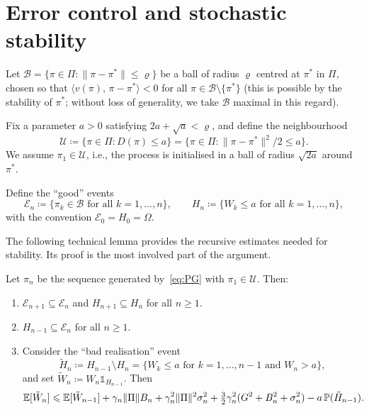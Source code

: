 \documentclass[a4paper,oneside,11pt]{report}
\newcommand{\ind}{\mathds{1}}
\newcommand{\Prob}{\mathbb{P}}
\newcommand{\calB}{\mathcal{B}}
\newcommand{\calE}{\mathcal{E}}
\newcommand{\calU}{\mathcal{U}}
\newcommand{\ip}[2]{\langle #1,\, #2 \rangle}
\newcommand{\norm}[1]{\| #1 \|}
\numberwithin{theorem}{chapter}
\numberwithin{equation}{chapter}
\begin{document}
\section{Error control and stochastic stability}
\label{sec:stability}

Let $\calB = \{\pi \in \Pi : \norm{\pi - \pi^*} \le \varrho\}$ be a
ball of radius $\varrho$ centred at $\pi^*$ in $\Pi$, chosen so that
$\ip{v(\pi)}{\pi - \pi^*} < 0$ for all
$\pi \in \calB \setminus \{\pi^*\}$ (this is possible by the stability
of $\pi^*$; without loss of generality, we take $\calB$ maximal in this
regard).

Fix a parameter $a > 0$ satisfying $2a + \sqrt{a} < \varrho$, and
define the neighbourhood
\begin{equation}
  \label{eq:U-def}
  \calU \coloneqq \{\pi \in \Pi : D(\pi) \le a\}
  = \bigl\{\pi \in \Pi : \norm{\pi - \pi^*}^2/2 \le a\bigr\}.
\end{equation}
We assume $\pi_1 \in \calU$, i.e., the process is initialised in a ball
of radius $\sqrt{2a}$ around~$\pi^*$.

Define the ``good'' events
\begin{equation}
  \label{eq:good-events}
  \calE_n \coloneqq \{\pi_k \in \calB
  \text{ for all } k = 1, \ldots, n\},
  \qquad
  H_n \coloneqq \{W_k \le a
  \text{ for all } k = 1, \ldots, n\},
\end{equation}
with the convention $\calE_0 = H_0 = \Omega$.

The following technical lemma provides the recursive estimates needed for
stability. Its proof is the most involved part of the argument.

\begin{lemma}
  \label{lem:error-control}
  Let $\pi_n$ be the sequence generated by~\eqref{eq:PG} with
  $\pi_1 \in \calU$. Then:
  \begin{enumerate}[label=\textup{(\alph*)}]
  \item $\calE_{n+1} \subseteq \calE_n$ and
    $H_{n+1} \subseteq H_n$ for all $n \ge 1$.
  \item $H_{n-1} \subseteq \calE_n$ for all $n \ge 1$.
  \item Consider the ``bad realisation'' event
    \begin{equation}
      \label{eq:bad-event}
      \tilde H_n \coloneqq H_{n-1} \setminus H_n
      = \{W_k \le a \text{ for } k = 1, \ldots, n-1
      \text{ and } W_n > a\},
    \end{equation}
    and set
    $\tilde W_n \coloneqq W_n \ind_{H_{n-1}}$. Then
    \begin{equation}
      \label{eq:Wtilde-recursion}
      \E[\tilde W_n] \le \E[\tilde W_{n-1}]
      + \gamma_n \norm{\Pi} B_n
      + \gamma_n^2 \norm{\Pi}^2 \sigma_n^2
      + \tfrac{3}{2}\gamma_n^2(G^2 + B_n^2 + \sigma_n^2)
      - a\, \Prob(\tilde H_{n-1}).
    \end{equation}
  \end{enumerate}
\end{lemma}
\end{document}
